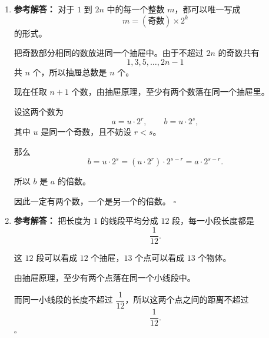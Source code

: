 \documentclass[11pt,a4paper,fontset=fandol]{ctexart}
\newenvironment{solution}{\par\noindent\textbf{参考解答：}}{\hfill$\square$\par}
\begin{document}
\begin{enumerate}
\begin{solution}
  因此最多能选 $14$ 个数。
  \end{solution}

  \item \begin{solution}
  对于 $1$ 到 $2n$ 中的每一个整数 $m$，都可以唯一写成
  \[
  m=(\text{奇数})\times 2^k
  \]
  的形式。

  把奇数部分相同的数放进同一个抽屉中。由于不超过 $2n$ 的奇数共有
  \[
  1,3,5,\ldots,2n-1
  \]
  共 $n$ 个，所以抽屉总数是 $n$ 个。

  现在任取 $n+1$ 个数，由抽屉原理，至少有两个数落在同一个抽屉里。

  设这两个数为
  \[
  a=u\cdot 2^r,
  \qquad
  b=u\cdot 2^s,
  \]
  其中 $u$ 是同一个奇数，且不妨设 $r<s$。

  那么
  \[
  b=u\cdot 2^s=(u\cdot 2^r)\cdot 2^{s-r}=a\cdot 2^{s-r}.
  \]

  所以 $b$ 是 $a$ 的倍数。

  因此一定有两个数，一个是另一个的倍数。
  \end{solution}

  \item \begin{solution}
  把长度为 $1$ 的线段平均分成 $12$ 段，每一小段长度都是
  \[
  \frac{1}{12}.
  \]

  这 $12$ 段可以看成 $12$ 个抽屉，$13$ 个点可以看成 $13$ 个物体。

  由抽屉原理，至少有两个点落在同一个小线段中。

  而同一小线段的长度不超过 $\dfrac{1}{12}$，所以这两个点之间的距离不超过
  \[
  \frac{1}{12}.
  \]
  \end{solution}
\end{enumerate}
\end{document}
